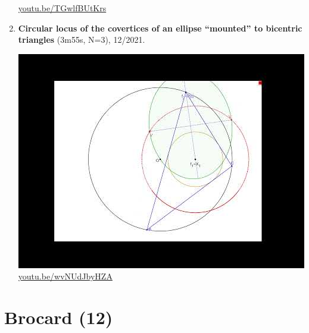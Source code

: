 \documentclass[12pt]{amsart}
\begin{document}
\begin{enumerate}[resume]
\begin{center}
\href{https://youtu.be/TGwlfBUtKrs}{\url{youtu.be/TGwlfBUtKrs}}\end{center}
% 
\item \textbf{Circular locus of the covertices of an ellipse ``mounted'' to bicentric triangles} (3m55s, N=3), 12/2021. 
\begin{center}\includegraphics[width=.5\textwidth]{pics/wvNUdJbyHZA.jpg} \\ 
\href{https://youtu.be/wvNUdJbyHZA}{\url{youtu.be/wvNUdJbyHZA}}\end{center}
% 
\end{enumerate}

\section{Brocard (12)}
\end{document}
